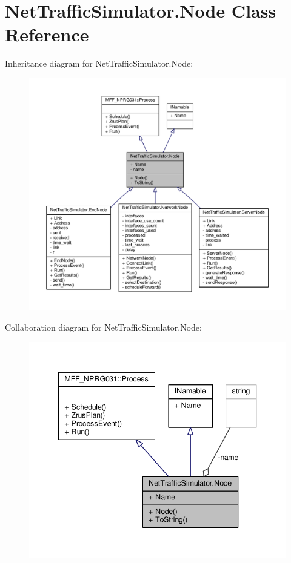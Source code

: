 \hypertarget{classNetTrafficSimulator_1_1Node}{\section{Net\-Traffic\-Simulator.\-Node Class Reference}
\label{classNetTrafficSimulator_1_1Node}
}


Inheritance diagram for Net\-Traffic\-Simulator.\-Node\-:
\nopagebreak
\begin{figure}[H]
\begin{center}
\leavevmode
\includegraphics[width=350pt]{classNetTrafficSimulator_1_1Node__inherit__graph}
\end{center}
\end{figure}


Collaboration diagram for Net\-Traffic\-Simulator.\-Node\-:\nopagebreak
\begin{figure}[H]
\begin{center}
\leavevmode
\includegraphics[width=344pt]{classNetTrafficSimulator_1_1Node__coll__graph}
\end{center}
\end{figure}
